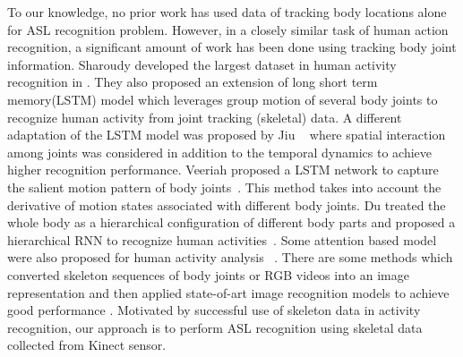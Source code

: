 \documentclass[10pt,twocolumn,letterpaper]{article}
\begin{document}
To our knowledge, no prior work has used data of tracking body locations alone for ASL recognition problem. However, in a closely similar task of human action recognition, a significant amount of work has been done using tracking body joint information. Sharoudy \etal developed the largest dataset in human activity recognition in \cite{7780484}. They also proposed an extension of long short term memory(LSTM) model which leverages group motion of several body joints to recognize human activity from joint tracking (skeletal) data. A different adaptation of the LSTM model was proposed by Jiu \etal ~\cite{8101019} where spatial interaction among joints was considered in addition to the temporal dynamics to achieve higher recognition performance. Veeriah \etal proposed a LSTM network to capture the salient motion pattern of body joints~\cite{7410817}. This method takes into account the derivative of motion states associated with different body joints. Du \etal treated the whole body as a hierarchical configuration of different body parts and proposed a hierarchical RNN to recognize human activities~\cite{7298714}. Some attention based model were also proposed for human activity analysis ~\cite{8226767, song2016end}. There are some methods which converted skeleton sequences of body joints or RGB videos into an image representation and then applied state-of-art image recognition models to achieve good performance \cite{DBLP:conf/cvpr/KeBASB17, DBLP:journals/corr/abs-1711-05941}.
Motivated by successful use of skeleton data in activity recognition, our approach is to perform ASL recognition using skeletal data collected from Kinect sensor.  
\end{document}

